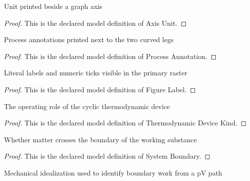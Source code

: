 \begin{definition}
  \label{def:physics:phyx-mini-0430:phyxminiproblems-problemphyxmini0430-axisunit}
  Unit printed beside a graph axis
\end{definition}
\begin{proof}
  This is the declared model definition of Axis Unit.
\end{proof}
\begin{definition}
  \label{def:physics:phyx-mini-0430:phyxminiproblems-problemphyxmini0430-processannotation}
  Process annotations printed next to the two curved legs
\end{definition}
\begin{proof}
  This is the declared model definition of Process Annotation.
\end{proof}
\begin{definition}
  \label{def:physics:phyx-mini-0430:phyxminiproblems-problemphyxmini0430-figurelabel}
  Literal labels and numeric ticks visible in the primary raster
\end{definition}
\begin{proof}
  This is the declared model definition of Figure Label.
\end{proof}
\begin{definition}
  \label{def:physics:phyx-mini-0430:phyxminiproblems-problemphyxmini0430-thermodynamicdevicekind}
  The operating role of the cyclic thermodynamic device
\end{definition}
\begin{proof}
  This is the declared model definition of Thermodynamic Device Kind.
\end{proof}
\begin{definition}
  \label{def:physics:phyx-mini-0430:phyxminiproblems-problemphyxmini0430-systemboundary}
  Whether matter crosses the boundary of the working substance
\end{definition}
\begin{proof}
  This is the declared model definition of System Boundary.
\end{proof}
\begin{definition}
  \label{def:physics:phyx-mini-0430:phyxminiproblems-problemphyxmini0430-processregime}
  Mechanical idealization used to identify boundary work from a pV path
\end{definition}
